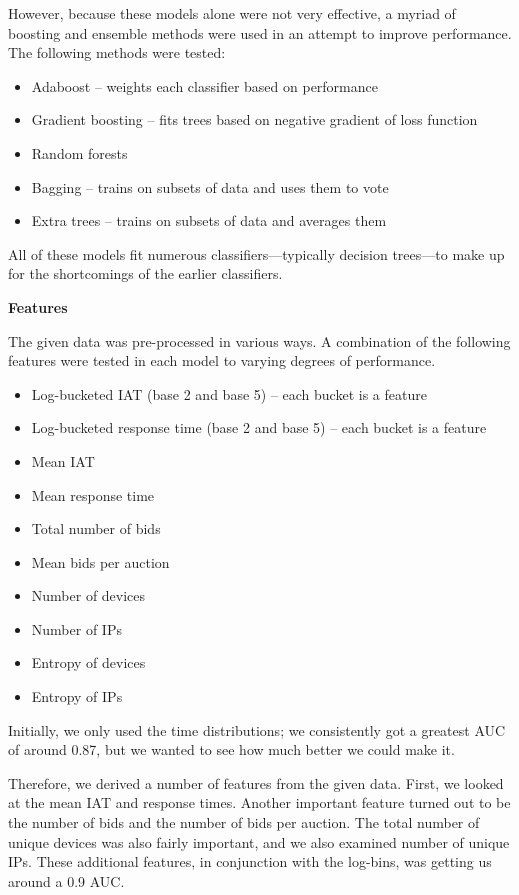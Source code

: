 \documentclass{article} %
\begin{document}
However, because these models alone were not very effective, a myriad of boosting and ensemble methods were used in an attempt to improve performance.
The following methods were tested:

\begin{itemize}
\item Adaboost -- weights each classifier based on performance
\item Gradient boosting -- fits trees based on negative gradient of loss function
\item Random forests
\item Bagging -- trains on subsets of data and uses them to vote
\item Extra trees -- trains on subsets of data and averages them
\end{itemize}

All of these models fit numerous classifiers---typically decision trees---to make up for the shortcomings of the earlier classifiers.

\textbf{Features}

The given data was pre-processed in various ways.
A combination of the following features were tested in each model to varying degrees of performance.

\begin{itemize}
\item Log-bucketed IAT (base 2 and base 5) -- each bucket is a feature
\item Log-bucketed response time (base 2 and base 5) -- each bucket is a feature
\item Mean IAT
\item Mean response time
\item Total number of bids
\item Mean bids per auction
\item Number of devices
\item Number of IPs
\item Entropy of devices
\item Entropy of IPs
\end{itemize}

Initially, we only used the time distributions; we consistently got a greatest AUC of around 0.87, but we wanted to see how much better we could make it.

Therefore, we derived a number of features from the given data.
First, we looked at the mean IAT and response times.
Another important feature turned out to be the number of bids and the number of bids per auction.
The total number of unique devices was also fairly important, and we also examined number of unique IPs.
These additional features, in conjunction with the log-bins, was getting us around a 0.9 AUC.
\end{document}
